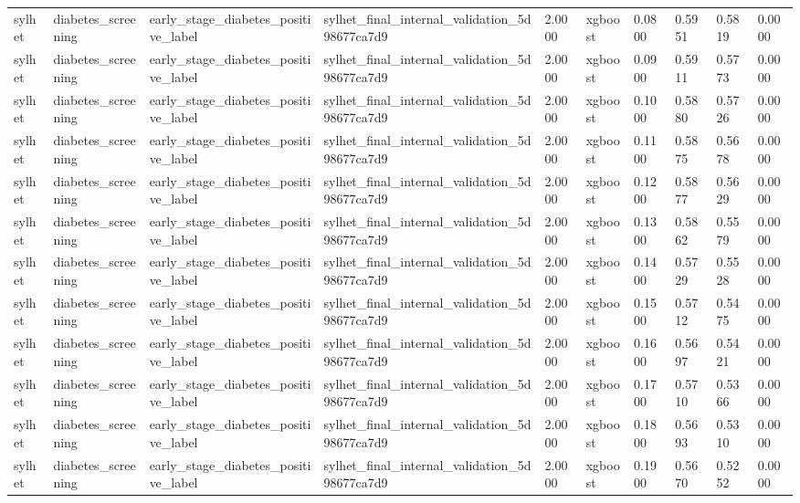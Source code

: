 \begin{tabular}{llllllllll}
sylhet & diabetes\_screening & early\_stage\_diabetes\_positive\_label & sylhet\_final\_internal\_validation\_5d98677ca7d9 & 2.0000 & xgboost & 0.0800 & 0.5951 & 0.5819 & 0.0000 \\
sylhet & diabetes\_screening & early\_stage\_diabetes\_positive\_label & sylhet\_final\_internal\_validation\_5d98677ca7d9 & 2.0000 & xgboost & 0.0900 & 0.5911 & 0.5773 & 0.0000 \\
sylhet & diabetes\_screening & early\_stage\_diabetes\_positive\_label & sylhet\_final\_internal\_validation\_5d98677ca7d9 & 2.0000 & xgboost & 0.1000 & 0.5880 & 0.5726 & 0.0000 \\
sylhet & diabetes\_screening & early\_stage\_diabetes\_positive\_label & sylhet\_final\_internal\_validation\_5d98677ca7d9 & 2.0000 & xgboost & 0.1100 & 0.5875 & 0.5678 & 0.0000 \\
sylhet & diabetes\_screening & early\_stage\_diabetes\_positive\_label & sylhet\_final\_internal\_validation\_5d98677ca7d9 & 2.0000 & xgboost & 0.1200 & 0.5877 & 0.5629 & 0.0000 \\
sylhet & diabetes\_screening & early\_stage\_diabetes\_positive\_label & sylhet\_final\_internal\_validation\_5d98677ca7d9 & 2.0000 & xgboost & 0.1300 & 0.5862 & 0.5579 & 0.0000 \\
sylhet & diabetes\_screening & early\_stage\_diabetes\_positive\_label & sylhet\_final\_internal\_validation\_5d98677ca7d9 & 2.0000 & xgboost & 0.1400 & 0.5729 & 0.5528 & 0.0000 \\
sylhet & diabetes\_screening & early\_stage\_diabetes\_positive\_label & sylhet\_final\_internal\_validation\_5d98677ca7d9 & 2.0000 & xgboost & 0.1500 & 0.5712 & 0.5475 & 0.0000 \\
sylhet & diabetes\_screening & early\_stage\_diabetes\_positive\_label & sylhet\_final\_internal\_validation\_5d98677ca7d9 & 2.0000 & xgboost & 0.1600 & 0.5697 & 0.5421 & 0.0000 \\
sylhet & diabetes\_screening & early\_stage\_diabetes\_positive\_label & sylhet\_final\_internal\_validation\_5d98677ca7d9 & 2.0000 & xgboost & 0.1700 & 0.5710 & 0.5366 & 0.0000 \\
sylhet & diabetes\_screening & early\_stage\_diabetes\_positive\_label & sylhet\_final\_internal\_validation\_5d98677ca7d9 & 2.0000 & xgboost & 0.1800 & 0.5693 & 0.5310 & 0.0000 \\
sylhet & diabetes\_screening & early\_stage\_diabetes\_positive\_label & sylhet\_final\_internal\_validation\_5d98677ca7d9 & 2.0000 & xgboost & 0.1900 & 0.5670 & 0.5252 & 0.0000 \\

\end{tabular}
